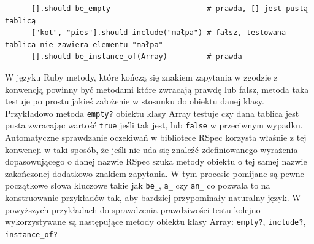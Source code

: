     \begin{verbatim}
      [].should be_empty                      # prawda, [] jest pustą tablicą
      ["kot", "pies"].should include("małpa") # fałsz, testowana tablica nie zawiera elementu "małpa"
      [].should be_instance_of(Array)         # prawda
    \end{verbatim}
    
    W języku Ruby metody, które kończą się znakiem zapytania w zgodzie z konwencją powinny być metodami które zwracają prawdę lub fałsz, metoda taka testuje po prostu jakieś założenie w stosunku do obiektu danej klasy. Przykładowo metoda \verb+empty?+ obiektu klasy Array testuje czy dana tablica jest pusta zwracając wartość \verb+true+ jeśli tak jest, lub \verb+false+ w przeciwnym wypadku. Automatyczne sprawdzanie oczekiwań w bibliotece RSpec korzysta właśnie z tej konwencji w taki sposób, że jeśli nie uda się znaleźć zdefiniowanego wyrażenia dopasowującego o danej nazwie RSpec szuka metody obiektu o tej samej nazwie zakończonej dodatkowo znakiem zapytania. W tym procesie pomijane są pewne początkowe słowa kluczowe takie jak \verb+be_+, \verb+a_+ czy \verb+an_+ co pozwala to na konstruowanie przykładów tak, aby bardziej przypominały naturalny język. W powyższych przykładach do sprawdzenia prawdziwości testu kolejno wykorzystywane są następujące metody obiektu klasy Array: \verb+empty?+, \verb+include?+, \verb+instance_of?+
    